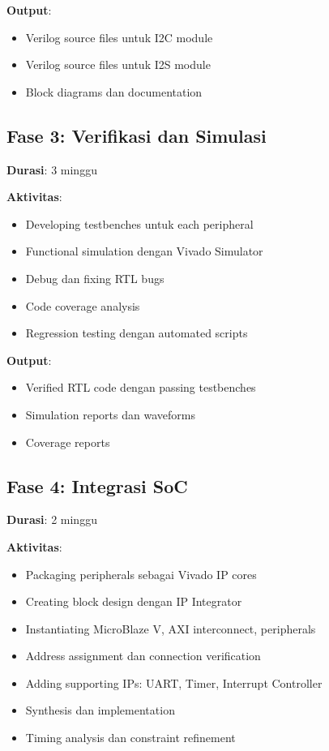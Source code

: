 \textbf{Output}:
\begin{itemize}
	\item Verilog source files untuk I2C module
	\item Verilog source files untuk I2S module
	\item Block diagrams dan documentation
\end{itemize}

\subsection{Fase 3: Verifikasi dan Simulasi}

\textbf{Durasi}: 3 minggu

\textbf{Aktivitas}:
\begin{itemize}
	\item Developing testbenches untuk each peripheral
	\item Functional simulation dengan Vivado Simulator
	\item Debug dan fixing RTL bugs
	\item Code coverage analysis
	\item Regression testing dengan automated scripts
\end{itemize}

\textbf{Output}:
\begin{itemize}
	\item Verified RTL code dengan passing testbenches
	\item Simulation reports dan waveforms
	\item Coverage reports
\end{itemize}

\subsection{Fase 4: Integrasi SoC}

\textbf{Durasi}: 2 minggu

\textbf{Aktivitas}:
\begin{itemize}
	\item Packaging peripherals sebagai Vivado IP cores
	\item Creating block design dengan IP Integrator
	\item Instantiating MicroBlaze V, AXI interconnect, peripherals
	\item Address assignment dan connection verification
	\item Adding supporting IPs: UART, Timer, Interrupt Controller
	\item Synthesis dan implementation
	\item Timing analysis dan constraint refinement
\end{itemize}

